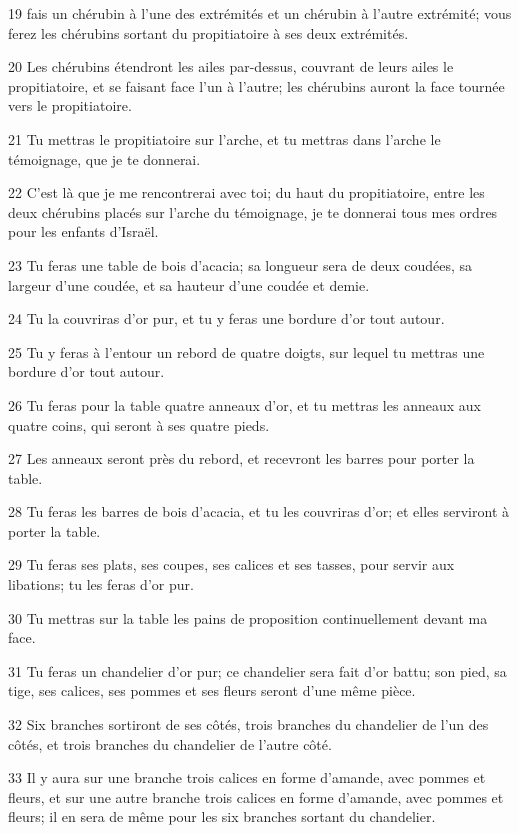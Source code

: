 \par 19 fais un chérubin à l'une des extrémités et un chérubin à l'autre extrémité; vous ferez les chérubins sortant du propitiatoire à ses deux extrémités.
\par 20 Les chérubins étendront les ailes par-dessus, couvrant de leurs ailes le propitiatoire, et se faisant face l'un à l'autre; les chérubins auront la face tournée vers le propitiatoire.
\par 21 Tu mettras le propitiatoire sur l'arche, et tu mettras dans l'arche le témoignage, que je te donnerai.
\par 22 C'est là que je me rencontrerai avec toi; du haut du propitiatoire, entre les deux chérubins placés sur l'arche du témoignage, je te donnerai tous mes ordres pour les enfants d'Israël.
\par 23 Tu feras une table de bois d'acacia; sa longueur sera de deux coudées, sa largeur d'une coudée, et sa hauteur d'une coudée et demie.
\par 24 Tu la couvriras d'or pur, et tu y feras une bordure d'or tout autour.
\par 25 Tu y feras à l'entour un rebord de quatre doigts, sur lequel tu mettras une bordure d'or tout autour.
\par 26 Tu feras pour la table quatre anneaux d'or, et tu mettras les anneaux aux quatre coins, qui seront à ses quatre pieds.
\par 27 Les anneaux seront près du rebord, et recevront les barres pour porter la table.
\par 28 Tu feras les barres de bois d'acacia, et tu les couvriras d'or; et elles serviront à porter la table.
\par 29 Tu feras ses plats, ses coupes, ses calices et ses tasses, pour servir aux libations; tu les feras d'or pur.
\par 30 Tu mettras sur la table les pains de proposition continuellement devant ma face.
\par 31 Tu feras un chandelier d'or pur; ce chandelier sera fait d'or battu; son pied, sa tige, ses calices, ses pommes et ses fleurs seront d'une même pièce.
\par 32 Six branches sortiront de ses côtés, trois branches du chandelier de l'un des côtés, et trois branches du chandelier de l'autre côté.
\par 33 Il y aura sur une branche trois calices en forme d'amande, avec pommes et fleurs, et sur une autre branche trois calices en forme d'amande, avec pommes et fleurs; il en sera de même pour les six branches sortant du chandelier.
